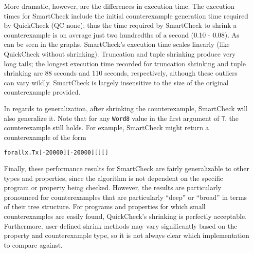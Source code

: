 \documentclass{sigplanconf}
\newenvironment{code}{\begin{alltt}}{\end{alltt}}
\newcommand{\ttp}[1]{\texttt{#1}}
\begin{document}
More dramatic, however, are the differences in execution time.  The execution
times for SmartCheck include the initial counterexample generation time required
by QuickCheck (QC none); thus the time required by SmartCheck to shrink a
counterexample is on average just two hundredths of a second (0.10 - 0.08).  As
can be seen in the graphs, SmartCheck's execution time scales linearly (like
QuickCheck without shrinking).  Truncation and tuple shrinking produce very long
tails; the longest execution time recorded for truncation shrinking and tuple
shrinking are 88 seconds and 110 seconds, respectively, although these outliers
can vary wildly.  SmartCheck is largely insensitive to the size of the original
counterexample provided.

In regards to generalization, after shrinking the counterexample, SmartCheck
will also generalize it.  Note that for any \ttp{Word8} value in the first
argument of \ttp{T}, the counterexample still holds.  For example, SmartCheck
might return a counterexample of the form
%
\begin{code}
forall x . T x [-20000] [-20000] [] []
\end{code}

Finally, these performance results for SmartCheck are fairly generalizable to
other types and properties, since the algorithm is not dependent on the specific
program or property being checked.  However, the results are particularly
pronounced for counterexamples that are particularly ``deep'' or ``broad'' in
terms of their tree structure.  For programs and properties for which small
counterexamples are easily found, QuickCheck's shrinking is perfectly
acceptable.  Furthermore, user-defined shrink methods may vary significantly
based on the property and counterexample type, so it is not always clear which
implementation to compare against.







\end{document}
